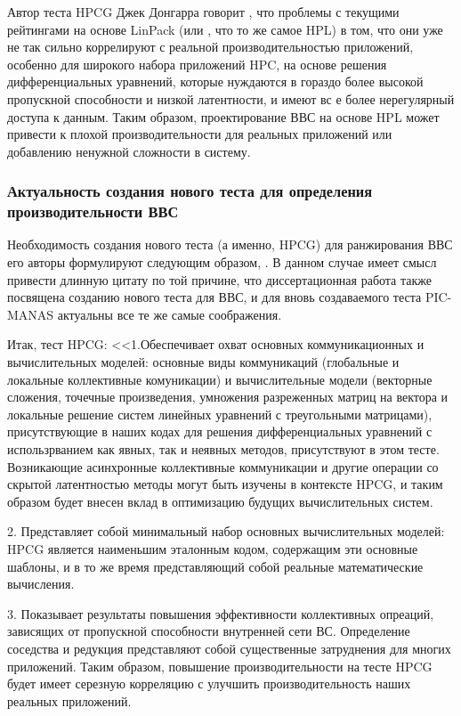 Автор теста HPCG Джек Донгарра говорит \cite{Dongarra2016HighperformanceCB}, что проблемы с текущими рейтингами на основе LinPack (или , что то же самое HPL) в том, что они уже не так сильно коррелируют с реальной производительностью приложений, особенно для широкого набора приложений HPC, на основе решения дифференциальных уравнений, которые нуждаются в гораздо более высокой пропускной способности и низкой латентности, и имеют вс е более нерегулярный доступа к данным. Таким образом, проектирование ВВС на основе HPL может привести к плохой производительности для реальных приложений или добавлению ненужной сложности в систему.


\subsubsection{Актуальность создания нового теста для определения производительности ВВС}
Необходимость создания нового теста (а именно, HPCG) для ранжирования ВВС его авторы формулируют следующим образом, \cite{HerouxHPCG}. В данном случае имеет смысл привести длинную цитату по той причине, что диссертационная работа также посвящена созданию нового теста для ВВС, и для вновь создаваемого теста PIC-MANAS актуальны все те же самые соображения.

Итак, тест HPCG:
<<1.Обеспечивает охват основных коммуникационных и вычислительных моделей:
основные виды коммуникаций (глобальные и локальные коллективные комуникации) и вычислительные модели
(векторные сложения, точечные произведения, умножения разреженных матриц на вектора и локальные решение систем линейных уравнений с треугольными матрицами), присутствующие в наших кодах для решения дифференциальных уравнений с использрванием как явных, так и неявных методов,
присутствуют в этом тесте. Возникающие асинхронные коллективные коммуникации и другие операции со скрытой латентностью методы могут быть изучены в контексте HPCG, и таким образом будет внесен вклад в оптимизацию будущих вычислительных систем.

2. Представляет собой минимальный набор основных вычислительных моделей: HPCG является наименьшим
эталонным кодом, содержащим эти основные шаблоны, и в то же время представляющий собой
реальные математические вычисления.

3. Показывает результаты повышения эффективности коллективных опреаций, зависящих от пропускной способности внутренней сети ВС. Определение соседства и редукция представляют собой существенные затруднения для многих приложений. Таким образом, повышение производительности на тесте HPCG будет
имеет серезную корреляцию с улучшить производительность наших реальных приложений.

